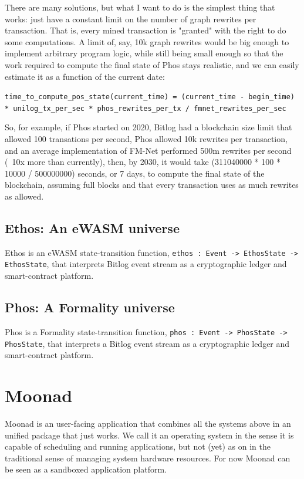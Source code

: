 \documentclass{article}
\theoremstyle{definition}
\theoremstyle{theorem}
\begin{document}
There are many solutions, but what I want to do is the simplest thing that
works: just have a constant limit on the number of graph rewrites per
transaction. That is, every mined transaction is "granted" with the right to do
some computations. A limit of, say, 10k graph rewrites would be big enough to
implement arbitrary program logic, while still being small enough so that the
work required to compute the final state of Phos stays realistic, and we can
easily estimate it as a function of the current date:

\verb|time_to_compute_pos_state(current_time) = (current_time - begin_time) * unilog_tx_per_sec * phos_rewrites_per_tx / fmnet_rewrites_per_sec  |

So, for example, if Phos started on 2020, Bitlog had a blockchain size limit
that allowed 100 transations per second, Phos allowed 10k rewrites per
transaction, and an average implementation of FM-Net performed 500m rewrites per
second (~10x more than currently), then, by 2030, it would take (311040000 * 100
* 10000 / 500000000) seconds, or 7 days, to compute the final state of the
blockchain, assuming full blocks and that every transaction uses as much
rewrites as allowed.

\subsection{Ethos: An eWASM universe}

Ethos is an eWASM state-transition function, 
\verb|ethos : Event -> EthosState -> EthosState|, that interprets Bitlog event
stream as a cryptographic ledger and smart-contract platform.

\subsection{Phos: A Formality universe}

Phos is a Formality state-transition function,
\verb|phos : Event -> PhosState -> PhosState|, that interprets a Bitlog event
stream as a cryptographic ledger and smart-contract platform.

\section{Moonad}

Moonad is an user-facing application that combines all the systems above in an
unified package that just works. We call it an operating system in the sense it
is capable of scheduling and running applications, but not (yet) as on in the
traditional sense of managing system hardware resources. For now Moonad can be
seen as a sandboxed application platform.
\end{document}
